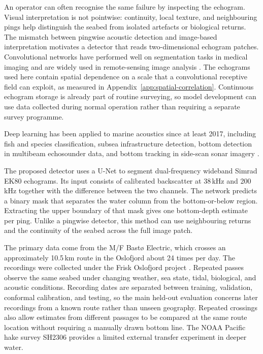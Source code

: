 An operator can often recognise the same failure by inspecting the echogram. Visual interpretation is not pointwise: continuity, local texture, and neighbouring pings help distinguish the seabed from isolated artefacts or biological returns. The mismatch between pingwise acoustic detection and image-based interpretation motivates a detector that reads two-dimensional echogram patches. Convolutional networks have performed well on segmentation tasks in medical imaging and are widely used in remote-sensing image analysis \citep{litjens_survey_2017,ma_deep_2019}. The echograms used here contain spatial dependence on a scale that a convolutional receptive field can exploit, as measured in Appendix~\ref{app:spatial-correlation}. Continuous echogram storage is already part of routine surveying, so model development can use data collected during normal operation rather than requiring a separate survey programme.

Deep learning has been applied to marine acoustics since at least 2017, including fish and species classification, subsea infrastructure detection, bottom detection in multibeam echosounder data, and bottom tracking in side-scan sonar imagery \citep{hirama_discriminating_2017,brautaset_acoustic_2020,yassir_acoustic_2023,du_revealing_2023,meng_antiinterference_2024,yan_bottom_2021}.

The proposed detector uses a U-Net \citep{ronneberger_unet_2015} to segment dual-frequency wideband Simrad EK80 echograms. Its input consists of calibrated backscatter at 38\,kHz and 200\,kHz together with the difference between the two channels. The network predicts a binary mask that separates the water column from the bottom-or-below region. Extracting the upper boundary of that mask gives one bottom-depth estimate per ping. Unlike a pingwise detector, this method can use neighbouring returns and the continuity of the seabed across the full image patch.

The primary data come from the M/F Bast\o{} Electric, which crosses an approximately 10.5\,km route in the Oslofjord about 24 times per day. The recordings were collected under the Frisk Oslofjord project \cite{frisk_oslofjord_mapping}. Repeated passes observe the same seabed under changing weather, sea state, tidal, biological, and acoustic conditions. Recording dates are separated between training, validation, conformal calibration, and testing, so the main held-out evaluation concerns later recordings from a known route rather than unseen geography. Repeated crossings also allow estimates from different passages to be compared at the same route location without requiring a manually drawn bottom line. The NOAA Pacific hake survey SH2306 provides a limited external transfer experiment in deeper water.

